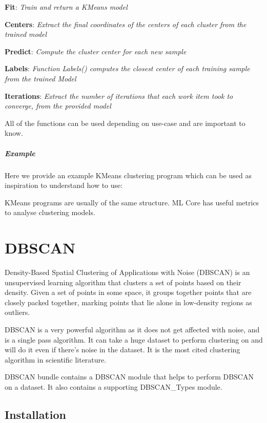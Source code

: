 \textbf{Fit}: \textit{Train and return a KMeans model}

\textbf{Centers}: \textit{Extract the final coordinates of the centers of each cluster from the trained model}

\textbf{Predict}: \textit{Compute the cluster center for each new sample}

\textbf{Labels}: \textit{Function Labels() computes the closest center of each training sample from the trained Model}

\textbf{Iterations}: \textit{Extract the number of iterations that each work item took to converge, from the provided model}

All of the functions can be used depending on use-case and are important to know.

\paragraph{Example}

Here we provide an example KMeans clustering program which can be used as inspiration to understand how to use:



KMeans programs are usually of the same structure. ML Core has useful metrics to analyse clustering models.

\chapter{DBSCAN}\label{unsupe:dbscan}

Density-Based Spatial Clustering of Applications with Noise (DBSCAN) is an unsupervised learning algorithm that clusters a set of points based on their density. Given a set of points in some space, it groups together points that are closely packed together, marking points that lie alone in low-density regions as outliers. 

DBSCAN is a very powerful algorithm as it does not get affected with noise, and is a single pass algorithm. It can take a huge dataset to perform clustering on and will do it even if there's noise in the dataset. It is the most cited clustering algorithm in scientific literature.

DBSCAN bundle contains a DBSCAN module that helps to perform DBSCAN on a dataset. It also contains a supporting DBSCAN\_Types module.

\section{Installation}

